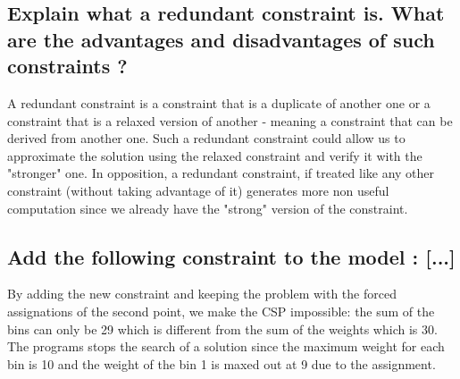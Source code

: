 \documentclass[a4paper ,12pt,french]{article}
\begin{document}
\subsection{Explain what a redundant constraint is. What are the advantages and disadvantages of such constraints ?}
A redundant constraint is a constraint that is a duplicate of another one or a constraint that is a relaxed version of another - meaning a constraint that can be derived from another one. Such a redundant constraint could allow us to approximate the solution using the relaxed constraint and verify it with the "stronger" one. In opposition, a redundant constraint, if treated like any other constraint (without taking advantage of it) generates more non useful computation since we already have the "strong" version of the constraint. 
\subsection{Add the following constraint to the model : [...]}
By adding the new constraint and keeping the problem with the forced assignations of the second point, we make the CSP impossible: the sum of the bins can only be 29 which is different from the sum of the weights which is 30. The programs stops the search of a solution since the maximum weight for each bin is 10 and the weight of the bin 1 is maxed out at 9 due to the assignment. 
\end{document}
